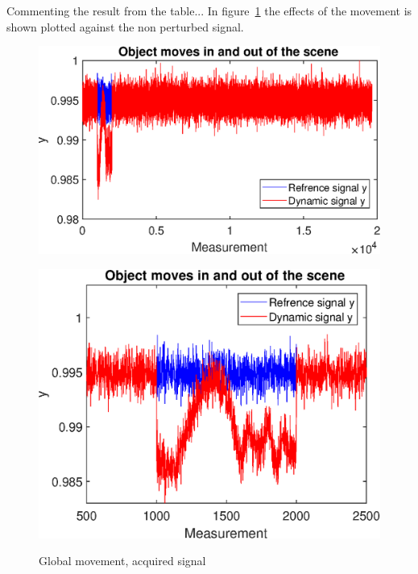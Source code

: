 Commenting the result from the table... In figure~\ref{fig:fly_sig} the effects of the movement is shown plotted against the non perturbed signal.\\[0.1in]


\begin{figure}[H]
    \centering
\begin{minipage}[t]{0.495\textwidth}
    \includegraphics[width=1\textwidth]{result/dynamic/fly/flyby_sig.eps}
    \label{fig:fly_sig_1}
\end{minipage}
\begin{minipage}[t]{0.495\textwidth}
    \includegraphics[width = \textwidth]{result/dynamic/fly/flyby_plot_win.eps}
    \label{fig:fly_sig_2}
\end{minipage}
    \caption{Global movement, acquired signal}
    \label{fig:fly_sig}
\end{figure}

